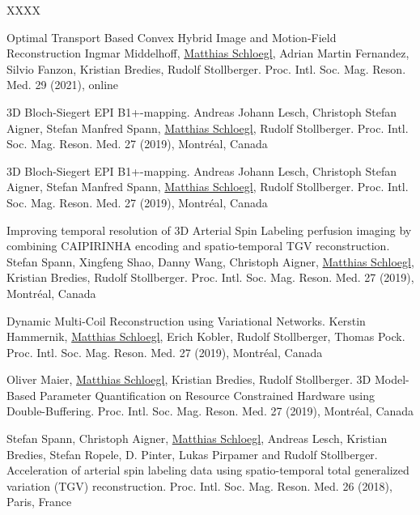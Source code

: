 \renewcommand{\refname}{\normalsize Conference proceedings}

\begin{thebibliography}{XXXX}

	\newblock Optimal Transport Based Convex Hybrid Image and Motion-Field Reconstruction
	\newblock Ingmar Middelhoff, \underline{Matthias Schloegl}, Adrian Martin Fernandez, Silvio Fanzon, Kristian Bredies, Rudolf Stollberger.
	\newblock Proc. Intl. Soc. Mag. Reson. Med. 29 (2021), online



	\newblock 3D Bloch-Siegert EPI B1+-mapping.
	\newblock Andreas Johann Lesch, Christoph Stefan Aigner, Stefan Manfred Spann, \underline{Matthias Schloegl}, Rudolf Stollberger.
	\newblock Proc. Intl. Soc. Mag. Reson. Med. 27 (2019),  Montr\'eal, Canada


	\newblock 3D Bloch-Siegert EPI B1+-mapping.
	\newblock Andreas Johann Lesch, Christoph Stefan Aigner, Stefan Manfred Spann, \underline{Matthias Schloegl}, Rudolf Stollberger.
	\newblock Proc. Intl. Soc. Mag. Reson. Med. 27 (2019),  Montr\'eal, Canada

	\newblock Improving temporal resolution of 3D Arterial Spin Labeling perfusion imaging by combining CAIPIRINHA encoding and spatio-temporal TGV reconstruction.
    \newblock Stefan Spann, Xingfeng Shao, Danny Wang, Christoph Aigner, \underline{Matthias Schloegl}, Kristian Bredies, Rudolf Stollberger.
	\newblock Proc. Intl. Soc. Mag. Reson. Med. 27 (2019),  Montr\'eal, Canada

	\newblock Dynamic Multi-Coil Reconstruction using Variational Networks.
	\newblock Kerstin Hammernik, \underline{Matthias Schloegl}, Erich Kobler, Rudolf Stollberger, Thomas Pock.
	\newblock Proc. Intl. Soc. Mag. Reson. Med. 27 (2019),  Montr\'eal, Canada

	\newblock Oliver Maier, \underline{Matthias Schloegl}, Kristian Bredies, Rudolf Stollberger.
 	\newblock 3D Model-Based Parameter Quantification on Resource Constrained Hardware using Double-Buffering.
	\newblock Proc. Intl. Soc. Mag. Reson. Med. 27 (2019),  Montr\'eal, Canada

	\newblock Stefan Spann, Christoph Aigner, \underline{Matthias Schloegl}, Andreas Lesch, Kristian Bredies, Stefan Ropele, D. Pinter, Lukas Pirpamer and Rudolf Stollberger. 
	\newblock Acceleration of arterial spin labeling data using spatio-temporal total generalized variation (TGV) reconstruction. 
	\newblock Proc. Intl. Soc. Mag. Reson. Med. 26 (2018), Paris, France


\end{thebibliography}
